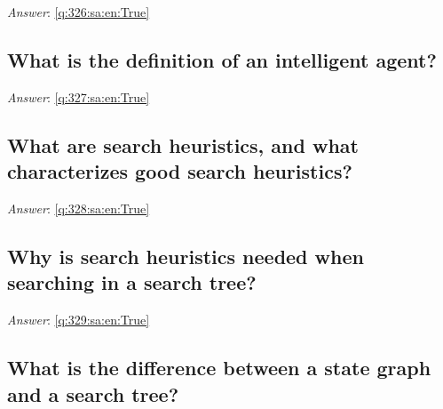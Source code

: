 \documentclass[a4paper,11pt,oneside]{article}
\begin{document}
\begin{sloppypar}
\noindent\makebox[\textwidth]{\hrulefill}

\vspace{1cm}

\textit{Answer}: \autoref{q:326:sa:en:True}



\subsection{What is the definition of an intelligent agent?}

\label{q:327:sa:en:False}

\vspace{2cm}

\noindent\makebox[\textwidth]{\hrulefill}

\vspace{1cm}

\textit{Answer}: \autoref{q:327:sa:en:True}



\subsection{What are search heuristics, and what characterizes good search heuristics?}

\label{q:328:sa:en:False}

\vspace{2cm}

\noindent\makebox[\textwidth]{\hrulefill}

\vspace{1cm}

\textit{Answer}: \autoref{q:328:sa:en:True}



\subsection{Why is search heuristics needed when searching in a search tree?}

\label{q:329:sa:en:False}

\vspace{2cm}

\noindent\makebox[\textwidth]{\hrulefill}

\vspace{1cm}

\textit{Answer}: \autoref{q:329:sa:en:True}



\subsection{What is the difference between a state graph and a search tree?}


\end{sloppypar}
\end{document}
